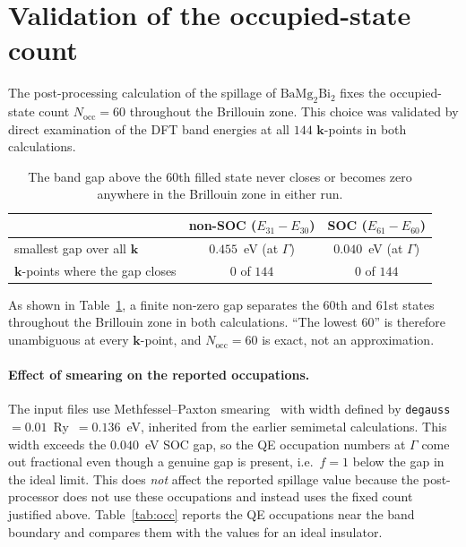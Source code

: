 \documentclass[11pt]{article}
\newcommand{\Nocc}{N_{\mathrm{occ}}}
\newcommand{\kk}{\mathbf{k}}
\newcommand{\bmb}{\mathrm{BaMg_2Bi_2}}
\begin{document}
\section{Validation of the occupied-state count}\label{sec:occ}

The post-processing calculation of the spillage of $\bmb$ fixes the occupied-state count
$\Nocc=60$ throughout the Brillouin zone. This choice was validated by direct examination of the DFT
band energies at all $144$ $\kk$-points in both calculations.

\begin{table}[htbp]
\centering
\caption{The band gap above the 60th filled state never closes or becomes zero anywhere in the
Brillouin zone in either run.}\label{tab:gapcheck}
\begin{tabular}{@{}lcc@{}}
\toprule
 & non-SOC ($E_{31}-E_{30}$) & SOC ($E_{61}-E_{60}$) \\
\midrule
smallest gap over all $\kk$ & $0.455$~eV (at $\Gamma$) & $0.040$~eV (at $\Gamma$) \\
$\kk$-points where the gap closes & $0$ of $144$ & $0$ of $144$ \\
\bottomrule
\end{tabular}
\end{table}

\noindent As shown in Table~\ref{tab:gapcheck}, a finite non-zero gap separates the 60th and 61st
states throughout the Brillouin zone in both calculations.
``The lowest 60'' is therefore unambiguous at every $\kk$-point, and $\Nocc=60$ is exact, not an
approximation.

\paragraph{Effect of smearing on the reported occupations.} The input files use Methfessel--Paxton
smearing~\cite{methfessel1989} with width defined by \texttt{degauss}~$=0.01$~Ry~$=0.136$~eV,
inherited from the earlier semimetal calculations. This width exceeds the $0.040$~eV SOC gap, so the
QE occupation numbers at $\Gamma$ come out fractional even though a genuine gap is present, i.e.\
$f=1$ below the gap in the ideal limit. This does \emph{not} affect the reported spillage value
because the post-processor does not use these occupations and instead uses the
fixed count justified above. Table~\ref{tab:occ} reports the QE occupations near the band boundary
and compares them with the values for an ideal insulator.
\end{document}
